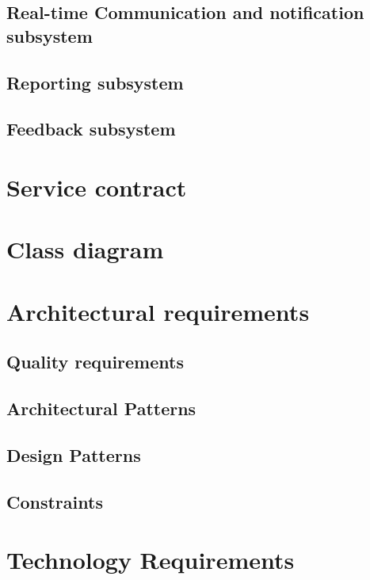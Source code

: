 \documentclass{article}
\begin{document}
	\subsection*{Real-time Communication and notification subsystem}	
	\subsection*{Reporting subsystem}	
	\subsection*{Feedback subsystem}	
	
	\newpage
	
	\section*{Service contract}	
	
	\newpage
	
	\section*{Class diagram}
	
	\newpage
	
	\section*{Architectural requirements}
	
	\subsection*{Quality requirements}	
	\subsection*{Architectural Patterns}	
	\subsection*{Design Patterns}	
	\subsection*{Constraints}	
	
	\newpage
	\section*{Technology Requirements}
	
	
\end{document}
